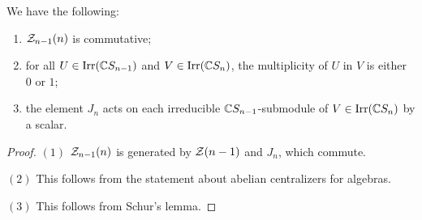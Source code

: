 \begin{corollary}
  We have the following:
  \begin{enumerate}
    \item $\mathcal{Z}_{n - 1}(n)$ is
      commutative;
    \item for all $U \in \operatorname{Irr}(\mathbb{C} S_{n - 1})$
      and $V \in \operatorname{Irr}(\mathbb{C} S_{n})$,
      the multiplicity of $U$ in $V$ is
      either $0$ or $1$;
    \item the element $J_n$ acts on
      each irreducible $\mathbb{C} S_{n - 1}$-submodule
      of $V \in \operatorname{Irr}(\mathbb{C} S_n)$
      by a scalar.
  \end{enumerate}
\end{corollary}

\begin{proof}
  $(1)$ $\mathcal{Z}_{n - 1}(n)$ is generated
  by $\mathcal{Z}(n - 1)$ and $J_n$, which commute.

  $(2)$ This follows from the statement
  about abelian centralizers for algebras.

  $(3)$ This follows from Schur's lemma.
\end{proof}

